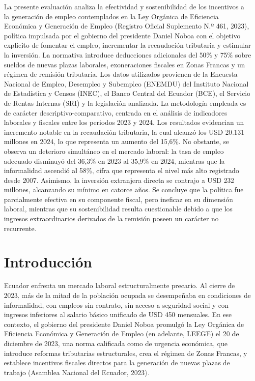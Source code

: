 \documentclass[12pt,spanish]{article}
\begin{document}
La presente evaluación analiza la efectividad y sostenibilidad de los
incentivos a la generación de empleo contemplados en la Ley Orgánica de
Eficiencia Económica y Generación de Empleo (Registro Oficial Suplemento
N.º 461, 2023), política impulsada por el gobierno del presidente Daniel
Noboa con el objetivo explícito de fomentar el empleo, incrementar la
recaudación tributaria y estimular la inversión. La normativa introduce
deducciones adicionales del 50\% y 75\% sobre sueldos de nuevas plazas
laborales, exoneraciones fiscales en Zonas Francas y un régimen de
remisión tributaria. Los datos utilizados provienen de la Encuesta
Nacional de Empleo, Desempleo y Subempleo (ENEMDU) del Instituto
Nacional de Estadística y Censos (INEC), el Banco Central del Ecuador
(BCE), el Servicio de Rentas Internas (SRI) y la legislación analizada.
La metodología empleada es de carácter descriptivo-comparativo, centrada
en el análisis de indicadores laborales y fiscales entre los periodos
2023 y 2024. Los resultados evidencian un incremento notable en la
recaudación tributaria, la cual alcanzó los USD 20.131 millones en 2024,
lo que representa un aumento del 15,6\%. No obstante, se observa un
deterioro simultáneo en el mercado laboral: la tasa de empleo adecuado
disminuyó del 36,3\% en 2023 al 35,9\% en 2024, mientras que la
informalidad ascendió al 58\%, cifra que representa el nivel más alto
registrado desde 2007. Asimismo, la inversión extranjera directa se
contrajo a USD 232 millones, alcanzando su mínimo en catorce años. Se
concluye que la política fue parcialmente efectiva en su componente
fiscal, pero ineficaz en su dimensión laboral, mientras que su
sostenibilidad resulta cuestionable debido a que los ingresos
extraordinarios derivados de la remisión poseen un carácter no
recurrente.

\section{Introducción}\label{introducciuxf3n}

Ecuador enfrenta un mercado laboral estructuralmente precario. Al cierre
de 2023, más de la mitad de la población ocupada se desempeñaba en
condiciones de informalidad, con empleos sin contrato, sin acceso a
seguridad social y con ingresos inferiores al salario básico unificado
de USD 450 mensuales. En ese contexto, el gobierno del presidente Daniel
Noboa promulgó la Ley Orgánica de Eficiencia Económica y Generación de
Empleo (en adelante, LEEGE) el 20 de diciembre de 2023, una norma
calificada como de urgencia económica, que introduce reformas
tributarias estructurales, crea el régimen de Zonas Francas, y establece
incentivos fiscales directos para la generación de nuevas plazas de
trabajo (Asamblea Nacional del Ecuador, 2023).
\end{document}
